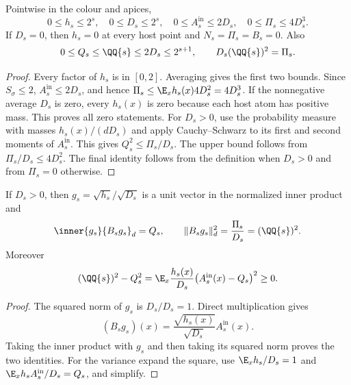 \begin{lemma}
\label{lem:conditional-bounds}
\proved Pointwise in the colour and apices,
\[
 0\le h_s\le2^s,\quad 0\le D_s\le2^s,\quad
 0\le A_s^{\mathrm{in}}\le2D_s,\quad
 0\le\Pi_s\le4D_s^3.
\]
If $D_s=0$, then $h_s=0$ at every host point and $N_s=\Pi_s=B_s=0$.
Also
\[
 0\le Q_s\le\QQ{s}\le2D_s\le2^{s+1},\qquad
 D_s(\QQ{s})^2=\Pi_s.
\]
\end{lemma}
\begin{proof}
Every factor of $h_s$ is in $[0,2]$.  Averaging gives the first two bounds.  Since
$S_\sigma\le2$, $A_s^{\mathrm{in}}\le2D_s$, and hence
$\Pi_s\le\E_x h_s(x)4D_s^2=4D_s^3$.  If the nonnegative average $D_s$ is zero, every
$h_s(x)$ is zero because each host atom has positive mass.  This proves all zero statements.
For $D_s>0$, use the probability measure with masses $h_s(x)/(dD_s)$ and apply
Cauchy--Schwarz to its first and second moments of $A_s^{\mathrm{in}}$.  This gives
$Q_s^2\le\Pi_s/D_s$.  The upper bound follows from $\Pi_s/D_s\le4D_s^2$.
The final identity follows from the definition when $D_s>0$ and from $\Pi_s=0$ otherwise.
\end{proof}

\begin{lemma}
\label{lem:conditional-vector}
\proved If $D_s>0$, then $g_s=\sqrt{h_s}/\sqrt{D_s}$ is a unit vector in the normalized
inner product and
\[
 \inner{g_s}{B_sg_s}_d=Q_s,\qquad
 \|B_sg_s\|_d^2=\frac{\Pi_s}{D_s}=(\QQ{s})^2.
\]
Moreover
\[
 (\QQ{s})^2-Q_s^2
 =\E_x\frac{h_s(x)}{D_s}\bigl(A_s^{\mathrm{in}}(x)-Q_s\bigr)^2\ge0.
\]
\end{lemma}
\begin{proof}
The squared norm of $g_s$ is $D_s/D_s=1$.  Direct multiplication gives
\[
 (B_sg_s)(x)=\frac{\sqrt{h_s(x)}}{\sqrt{D_s}}A_s^{\mathrm{in}}(x).
\]
Taking the inner product with $g_s$ and then taking its squared norm proves the two
identities.  For the variance expand the square, use
$\E_x h_s/D_s=1$ and $\E_x h_sA_s^{\mathrm{in}}/D_s=Q_s$, and simplify.
\end{proof}

